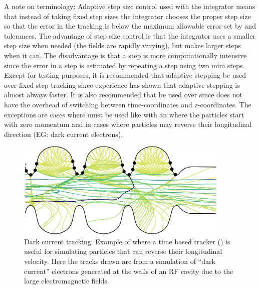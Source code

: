 A note on terminology: Adaptive step size control used with the  integrator means
that instead of taking fixed step sizes the integrator chooses the proper step size so that the
error in the tracking is below the maximum allowable error set by  and
 tolerances. The advantage of step size control is that the integrator
uses a smaller step size when needed (the fields are rapidly varying), but makes larger steps when
it can. The disadvantage is that a step is more computationally intensive since the error in a step
is estimated by repeating a step using two mini steps. Except for testing purposes, it is
recommended that adaptive stepping be used over fixed step tracking since experience has shown that
adaptive stepping is almost always faster.  It is also recommended that  be used
over  since  does not have the overhead of switching between
time-coordinates and z-coordinates. The exceptions are cases where  must be
used like with an  where the particles start with zero momentum and in cases where
particles may reverse their longitudinal direction (EG: dark current electrons).

\begin{figure}[tb]
  \centering
  \includegraphics[width=4in]{dark-current.pdf}
  \caption[Dark current tracking.]{
Dark current tracking. Example of where a time based tracker () is useful for
simulating particles that can reverse their longitudinal velocity. Here the tracks drawn are from a
simulation of ``dark current'' electrons generated at the walls of an RF cavity due to the large
electromagnetic fields.  }
  \label{f:dark.current}
\end{figure}


